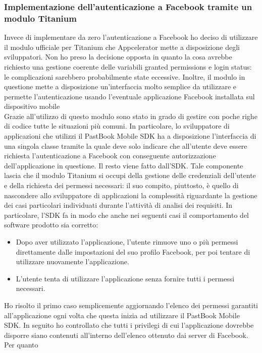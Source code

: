 			\subsubsection{Implementazione dell'autenticazione a Facebook tramite un modulo Titanium}
				Invece di implementare da zero l'autenticazione a Facebook ho deciso di utilizzare il modulo ufficiale per Titanium
				che Appcelerator mette a disposizione degli sviluppatori. Non ho preso la decisione opposta in quanto la cosa
				avrebbe richiesto una gestione coerente delle variabili granted permissions e login status: le complicazioni
				sarebbero probabilmente state eccessive. Inoltre, il modulo in questione mette a disposizione un'interfaccia
				molto semplice da utilizzare e permette l'autenticazione usando l'eventuale applicazione Facebook installata sul
				dispositivo mobile\\
				Grazie all'utilizzo di questo modulo sono stato in grado di gestire con poche righe di codice tutte le situazioni più
				comuni. In particolare, lo sviluppatore di applicazioni che utilizzi il PastBook Mobile SDK ha a disposizione
				l'interfaccia di una singola classe tramite la quale deve solo indicare che all'utente deve essere richiesta
				l'autenticazione a Facebook con conseguente autorizzazione dell'applicazione in questione. Il resto viene fatto
				dall'SDK. Tale componente lascia che il modulo Titanium si occupi della gestione delle credenziali dell'utente e
				della richiesta dei permessi necessari: il suo compito, piuttosto, è quello di nascondere allo sviluppatore di
				applicazioni la complessità riguardante la gestione dei casi particolari individuati durante l'attività di analisi
				dei requisiti. In particolare, l'SDK fa in modo che anche nei seguenti casi il comportamento del software prodotto
				sia corretto:
				\begin{itemize}
					\item Dopo aver utilizzato l'applicazione, l'utente rimuove uno o più permessi direttamente dalle
					impostazioni del suo profilo Facebook, per poi tentare di utilizzare nuovamente l'applicazione.
					\item L'utente tenta di utilizzare l'applicazione senza fornire tutti i permessi necessari.
				\end{itemize}
				Ho risolto il primo caso semplicemente aggiornando l'elenco dei permessi garantiti all'applicazione ogni volta che
				questa inizia ad utilizzare il PastBook Mobile SDK. In seguito ho controllato che tutti i privilegi di cui
				l'applicazione dovrebbe disporre siano contenuti all'interno dell'elenco ottenuto dai server di Facebook. Per quanto
